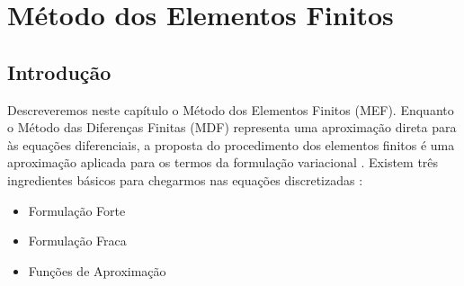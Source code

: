 \section{Método dos Elementos Finitos}

\subsection{Introdução}

Descreveremos neste capítulo o Método dos
Elementos Finitos (MEF). Enquanto o Método
das Diferenças Finitas (MDF) representa
uma aproximação direta para às equações
diferenciais, a proposta do procedimento
dos elementos finitos é uma aproximação
aplicada para os termos da formulação
variacional \cite{zienkiewicz1965}. Existem
três ingredientes básicos para chegarmos nas
equações discretizadas \cite{fish2007}:

\begin{itemize}
 \item Formulação Forte
 \item Formulação Fraca
 \item Funções de Aproximação
\end{itemize}

